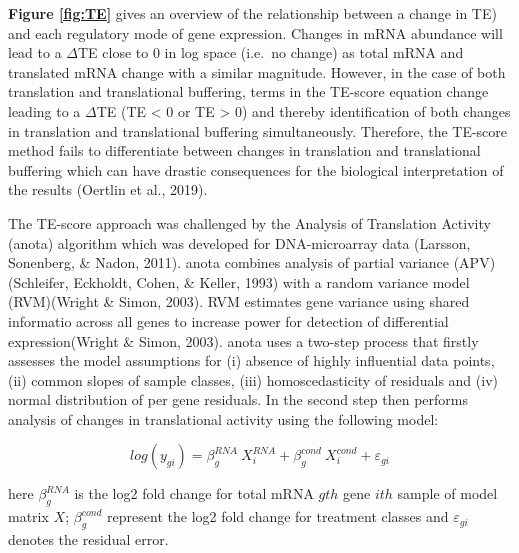 \documentclass[
  12pt,
  openany]{book}
\begin{document}
\textbf{Figure \ref{fig:TE}} gives an overview of the relationship between a change in TE) and each regulatory mode of gene expression. Changes in mRNA abundance will lead to a \(\varDelta\)TE close to 0 in log space (i.e.~no change) as total mRNA and translated mRNA change with a similar magnitude. However, in the case of both translation and translational buffering, terms in the TE-score equation change leading to a \(\varDelta\)TE (TE \textless{} 0 or TE \textgreater{} 0) and thereby identification of both changes in translation and translational buffering simultaneously. Therefore, the TE-score method fails to differentiate between changes in translation and translational buffering which can have drastic consequences for the biological interpretation of the results (Oertlin et al., 2019).

The TE-score approach was challenged by the Analysis of Translation Activity (anota) algorithm which was developed for DNA-microarray data (Larsson, Sonenberg, \& Nadon, 2011). anota combines analysis of partial variance (APV)(Schleifer, Eckholdt, Cohen, \& Keller, 1993) with a random variance model (RVM)(Wright \& Simon, 2003). RVM estimates gene variance using shared informatio across all genes to increase power for detection of differential expression(Wright \& Simon, 2003). anota uses a two-step process that firstly assesses the model assumptions for (i) absence of highly influential data points, (ii) common slopes of sample classes, (iii) homoscedasticity of residuals and (iv) normal distribution of per gene residuals. In the second step then performs analysis of changes in translational activity using the following model:

\[log(y_{gi}) = \beta_g^{RNA}\ X_i^{RNA}+ \beta_g^{cond}\ X_i^{cond} + \varepsilon_{gi}\]

here \(\beta_g^{RNA}\) is the log2 fold change for total mRNA \(gth\) gene \(ith\) sample of model matrix \(X\); \(\beta_g^{cond}\) represent the log2 fold change for treatment classes and \(\varepsilon_{gi}\) denotes the residual error.
\end{document}
